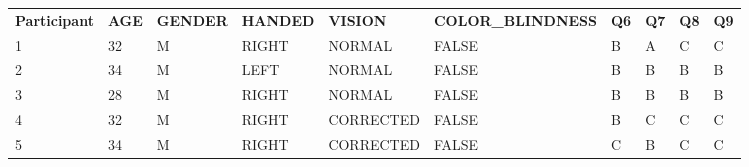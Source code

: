 \begin{table}[]
    \centering
    \begin{tabular}{llllllllll}
    \textbf{Participant} & \textbf{AGE} & \textbf{GENDER} & \textbf{HANDED} & \textbf{VISION} & \textbf{COLOR\_BLINDNESS} & \textbf{Q6} & \textbf{Q7} & \textbf{Q8} & \textbf{Q9} \\
    1             & 32           & M               & RIGHT           & NORMAL          & FALSE                     & B           & A           & C           & C           \\
    2             & 34           & M               & LEFT            & NORMAL          & FALSE                     & B           & B           & B           & B           \\
    3             & 28           & M               & RIGHT           & NORMAL          & FALSE                     & B           & B           & B           & B           \\
    4             & 32           & M               & RIGHT           & CORRECTED       & FALSE                     & B           & C           & C           & C           \\
    5             & 34           & M               & RIGHT           & CORRECTED       & FALSE                     & C           & B           & C           & C          
    \end{tabular}
    \end{table}